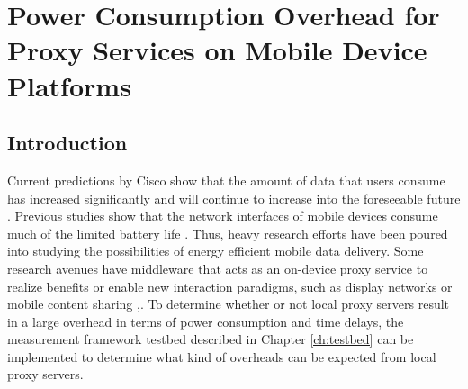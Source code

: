 \chapter{Power Consumption Overhead for Proxy Services on Mobile Device Platforms}
\section*{Introduction}
Current predictions by Cisco show that the amount of data that users consume has increased significantly and will continue to increase into the foreseeable future \cite{VNI14}. Previous studies show that the network interfaces of mobile devices consume much of the limited battery life \cite{Carroll:2010:APC:1855840.1855861}. Thus, heavy research efforts have been poured into studying the possibilities of energy efficient mobile data delivery. Some research avenues have middleware that acts as an on-device proxy service to realize benefits or enable new interaction paradigms, such as display networks \cite{6174992} or mobile content sharing \cite{Seeling:2014:OES:2671189.2671194},\cite{6692468}. To determine whether or not local proxy servers result in a large overhead in terms of power consumption and time delays, the measurement framework testbed described in Chapter \ref{ch:testbed} can be implemented to determine what kind of overheads can be expected from local proxy servers. 
